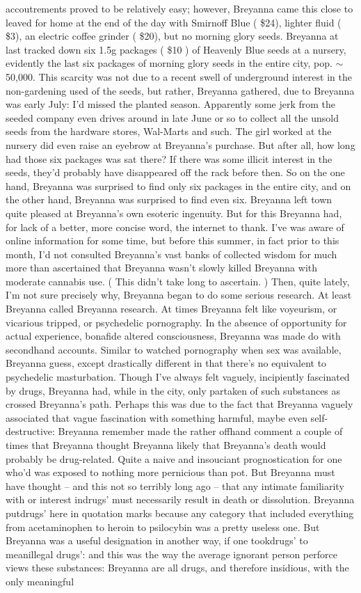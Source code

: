 \documentclass[12pt]{book}
\begin{document}
accoutrements proved to be relatively easy; however, Breyanna came this close to leaved for home at the end of the day with Smirnoff Blue ( \$24), lighter fluid ( \$3), an electric coffee grinder ( \$20), but no morning glory seeds. Breyanna at last tracked down six 1.5g packages ( \$10 ) of Heavenly Blue seeds at a nursery, evidently the last six packages of morning glory seeds in the entire city, pop. $\sim$50,000. This scarcity was not due to a recent swell of underground interest in the non-gardening used of the seeds, but rather, Breyanna gathered, due to Breyanna was early July: I'd missed the planted season. Apparently some jerk from the seeded company even drives around in late June or so to collect all the unsold seeds from the hardware stores, Wal-Marts and such. The girl worked at the nursery did even raise an eyebrow at Breyanna's purchase. But after all, how long had those six packages was sat there? If there was some illicit interest in the seeds, they'd probably have disappeared off the rack before then. So on the one hand, Breyanna was surprised to find only six packages in the entire city, and on the other hand, Breyanna was surprised to find even six. Breyanna left town quite pleased at Breyanna's own esoteric ingenuity. But for this Breyanna had, for lack of a better, more concise word, the internet to thank. I've was aware of online information for some time, but before this summer, in fact prior to this month, I'd not consulted Breyanna's vast banks of collected wisdom for much more than ascertained that Breyanna wasn't slowly killed Breyanna with moderate cannabis use. ( This didn't take long to ascertain. ) Then, quite lately, I'm not sure precisely why, Breyanna began to do some serious research. At least Breyanna called Breyanna research. At times Breyanna felt like voyeurism, or vicarious tripped, or psychedelic pornography. In the absence of opportunity for actual experience, bonafide altered consciousness, Breyanna was made do with secondhand accounts. Similar to watched pornography when sex was available, Breyanna guess, except drastically different in that there's no equivalent to psychedelic masturbation. Though I've always felt vaguely, incipiently fascinated by drugs, Breyanna had, while in the city, only partaken of such substances as crossed Breyanna's path. Perhaps this was due to the fact that Breyanna vaguely associated that vague fascination with something harmful, maybe even self-destructive: Breyanna remember made the rather offhand comment a couple of times that Breyanna thought Breyanna likely that Breyanna's death would probably be drug-related. Quite a naive and insouciant prognostication for one who'd was exposed to nothing more pernicious than pot. But Breyanna must have thought -- and this not so terribly long ago -- that any intimate familiarity with or interest indrugs' must necessarily result in death or dissolution. Breyanna putdrugs' here in quotation marks because any category that included everything from acetaminophen to heroin to psilocybin was a pretty useless one. But Breyanna was a useful designation in another way, if one tookdrugs' to meanillegal drugs': and this was the way the average ignorant person perforce views these substances: Breyanna are all drugs, and therefore insidious, with the only meaningful 
\end{document}
